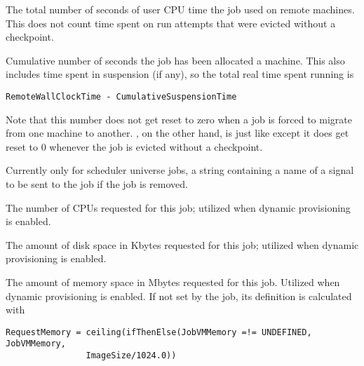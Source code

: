 \begin{description}
\item[\AdAttr{RemoteUserCpu}:]  The total number of seconds
of user CPU time the job used on remote machines.  This does not
count time spent on run attempts that were evicted without a checkpoint.


\label{RemoteWallClockTime}
\item[\AdAttr{RemoteWallClockTime}:]  Cumulative number of seconds
the job has been allocated a machine.
This also includes time spent in suspension (if any),
so the total real time spent running is 
\begin{verbatim}
RemoteWallClockTime - CumulativeSuspensionTime
\end{verbatim}
Note that this number does not get reset to
zero when a job is forced to migrate from one machine to another.
, on the other hand, is just like
 except it does get reset to 0 whenever
the job is evicted without a checkpoint.

\item[\AdAttr{RemoveKillSig}:]    Currently only for scheduler universe jobs,
a string containing a name of
a signal to be sent to the job if the job is removed.

\item[\AdAttr{RequestCpus}:]  The number of CPUs requested for this job;
utilized when dynamic  provisioning is enabled.

\item[\AdAttr{RequestDisk}:]  The amount of disk space in Kbytes requested 
for this job; utilized when dynamic  provisioning is enabled.

\item[\AdAttr{RequestMemory}:]  The amount of memory space in Mbytes 
requested for this job.
Utilized when dynamic  provisioning is enabled.
If not set by the job, its definition is calculated with
\footnotesize
\begin{verbatim}
RequestMemory = ceiling(ifThenElse(JobVMMemory =!= UNDEFINED, JobVMMemory, 
                ImageSize/1024.0))
\end{verbatim}
\normalsize


\end{description}
